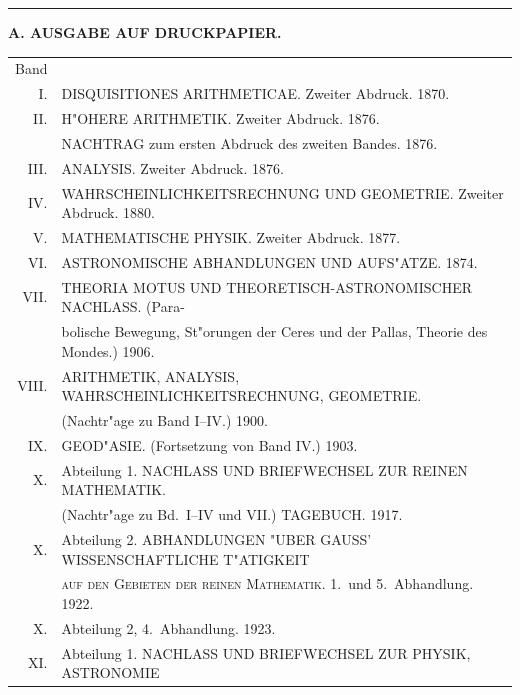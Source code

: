 \documentclass[12pt,a4paper]{article}
\theoremstyle{plain}
\theoremstyle{definition}
\theoremstyle{remark}
\begin{document}
\vspace{1em}
\hrule
\vspace{1em}

\begin{center}\textbf{A. AUSGABE AUF DRUCKPAPIER.}\end{center}

\begin{tabular}{@{}rp{11cm}@{}}
Band &\\
\textsc{I.} & \textsc{DISQUISITIONES ARITHMETICAE.} Zweiter Abdruck. 1870.\\[0.3em]
\textsc{II.} & \textsc{H"OHERE ARITHMETIK.} Zweiter Abdruck. 1876.\\
& \textsc{NACHTRAG} zum ersten Abdruck des zweiten Bandes. 1876.\\[0.3em]
\textsc{III.} & \textsc{ANALYSIS.} Zweiter Abdruck. 1876.\\[0.3em]
\textsc{IV.} & \textsc{WAHRSCHEINLICHKEITSRECHNUNG UND GEOMETRIE.} Zweiter Abdruck. 1880.\\[0.3em]
\textsc{V.} & \textsc{MATHEMATISCHE PHYSIK.} Zweiter Abdruck. 1877.\\[0.3em]
\textsc{VI.} & \textsc{ASTRONOMISCHE ABHANDLUNGEN UND AUFS"ATZE.} 1874.\\[0.3em]
\textsc{VII.} & \textsc{THEORIA MOTUS UND THEORETISCH-ASTRONOMISCHER NACHLASS.} (Para-\\
& bolische Bewegung, St"orungen der Ceres und der Pallas, Theorie des Mondes.) 1906.\\[0.3em]
\textsc{VIII.} & \textsc{ARITHMETIK, ANALYSIS, WAHRSCHEINLICHKEITSRECHNUNG, GEOMETRIE.}\\
& (Nachtr"age zu Band I--IV.) 1900.\\[0.3em]
\textsc{IX.} & \textsc{GEOD"ASIE.} (Fortsetzung von Band IV.) 1903.\\[0.3em]
\textsc{X.} & Abteilung 1. \textsc{NACHLASS UND BRIEFWECHSEL ZUR REINEN MATHEMATIK.}\\
& (Nachtr"age zu Bd.\ I--IV und VII.) \textsc{TAGEBUCH.} 1917.\\[0.3em]
\textsc{X.} & Abteilung 2. \textsc{ABHANDLUNGEN "UBER GAUSS' WISSENSCHAFTLICHE T"ATIGKEIT}\\
& \textsc{auf den Gebieten der reinen Mathematik.} 1.\ und 5.\ Abhandlung. 1922.\\[0.3em]
\textsc{X.} & Abteilung 2, 4.\ Abhandlung. 1923.\\[0.3em]
\textsc{XI.} & Abteilung 1. \textsc{NACHLASS UND BRIEFWECHSEL ZUR PHYSIK, ASTRONOMIE}\\

\end{tabular}
\end{document}
